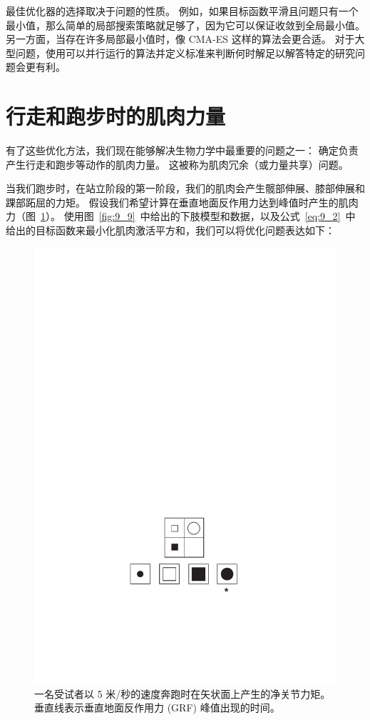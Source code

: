 最佳优化器的选择取决于问题的性质。
例如，如果目标函数平滑且问题只有一个最小值，那么简单的局部搜索策略就足够了，因为它可以保证收敛到全局最小值。
另一方面，当存在许多局部最小值时，像 CMA-ES 这样的算法会更合适。
对于大型问题，使用可以并行运行的算法并定义标准来判断何时解足以解答特定的研究问题会更有利。



\section{行走和跑步时的肌肉力量}

有了这些优化方法，我们现在能够解决生物力学中最重要的问题之一：
确定负责产生行走和跑步等动作的肌肉力量。
这被称为肌肉冗余（或力量共享）问题。


当我们跑步时，在站立阶段的第一阶段，我们的肌肉会产生髋部伸展、膝部伸展和踝部跖屈的力矩。
假设我们希望计算在垂直地面反作用力达到峰值时产生的肌肉力（图~\ref{fig:9_8}）。
使用图~\ref{fig:9_9}~中给出的下肢模型和数据，以及公式~\ref{eq:9_2}~中给出的目标函数来最小化肌肉激活平方和，我们可以将优化问题表达如下：


\begin{figure}[!htb]
	\centering
	\includegraphics[width=0.7\linewidth]{chap9/9_8}
	\caption{一名受试者以 5 米/秒的速度奔跑时在矢状面上产生的净关节力矩。
		垂直线表示垂直地面反作用力 (GRF) 峰值出现的时间\cite{hamner2013muscle}。 \label{fig:9_8}}
\end{figure}



